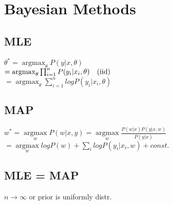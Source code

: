 \section{Bayesian Methods}
\subsection*{MLE}
$\theta^* = \operatorname{argmax}_\theta P(y|x,\theta) $\\
$= {\operatorname{argmax}}_\theta \prod_{i=1}^n P(y_i|x_i, \theta) \text{\quad (iid)}$\\
$= {\operatorname{argmax}}_\theta \sum_{i=1}^n log P(y_i|x_i,\theta)$

\subsection*{MAP}
$w^* = \underset{w}{\operatorname{argmax}} P(w|x,y) = \underset{w}{\operatorname{argmax}} \frac{P(w|x) P(y|x,w)}{P(y|x)}$\\ 
$=\underset{w}{\operatorname{argmax}} log P(w) + \sum_i log P(y_i|x_i,w) + const.$

\subsection*{MLE = MAP}
$n \rightarrow \infty$ or prior is uniformly distr.